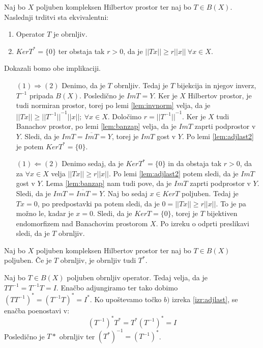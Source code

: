 \documentclass[mat2]{matdelo}
\newcommand{\abs}[1]{\ensuremath{\lvert #1 \rvert}}
\newcommand{\norm}[1]{\abs{\abs{#1}}}
\begin{document}
			\begin{posledica}
				\label{posl:adjinv}
				Naj bo $X$ poljuben kompleksen Hilbertov prostor ter naj bo $T\in B(X)$. Naslednji trditvi sta ekvivalentni: \begin{enumerate}
					\item Operator $T$ je obrnljiv.
					\item $KerT^* = \{0\}$ ter obstaja tak $r > 0$, da je $\norm{Tx} \geq r\norm{x}~\forall x\in X$.
				\end{enumerate}
			\end{posledica}
			
			\begin{dokaz}
				Dokazali bomo obe implikaciji.
				\begin{itemize}
					\item[$(1)\Rightarrow (2)$] Denimo, da je $T$ obrnljiv. Tedaj je $T$ bijekcija in njegov inverz, $T^{-1}$ pripada $B(X)$. Posledično je $ImT = Y$. Ker je $X$ Hilbertov prostor, je tudi normiran prostor, torej po lemi \ref{lem:invnorm} velja, da je $\norm{Tx}\geq \norm{T^{-1}}^{-1}\norm{x};~\forall x\in X$. Določimo $r = \norm{T^{-1}}^{-1}$. Ker je $X$ tudi Banachov prostor, po lemi \ref{lem:banzap} velja, da je $ImT$ zaprti podprostor v $Y$. Sledi, da je $ImT = \overline{ImT} = Y$, torej je $ImT$ gost v $Y$. Po lemi \ref{lem:adjlast2} je potem $KerT^* = \{0\}$.
					\item[$(1)\Leftarrow (2)$] Denimo sedaj, da je $KerT^* = \{0\}$ in da obstaja tak $r>0$, da za $\forall x\in X$ velja $\norm{Tx} \geq r\norm{x}$. Po lemi \ref{lem:adjlast2} potem sledi, da je $ImT$ gost v $Y$. Lema \ref{lem:banzap} nam tudi pove, da je $ImT$ zaprti podprostor v $Y$. Sledi, da je $ImT = \overline{ImT} = Y$.
					Naj bo sedaj $x\in KerT$ poljuben. Tedaj je $Tx = 0$, po predpostavki pa potem sledi, da je $0 = \norm{Tx} \geq r\norm{x}$. To je pa možno le, kadar je $x = 0$. Sledi, da je $KerT = \{0\}$, torej je $T$ bijektiven endomorfizem nad Banachovim prostorom $X$. Po izreku o odprti preslikavi sledi, da je $T$ obrnljiv.
				\end{itemize}
			\end{dokaz}
			
			\begin{lema}
				\label{lem:adjinv}
				Naj bo $X$ poljuben kompleksen Hilbertov prostor ter naj bo $T\in B(X)$ poljuben. Če je $T$ obrnljiv, je obrnljiv tudi $T^*$.
			\end{lema}
		
			\begin{dokaz}
				Naj bo $T\in B(X)$ poljuben obrnljiv operator. Tedaj velja, da je $TT^{-1} = T^{-1}T = I$. Enačbo adjungiramo ter tako dobimo $(TT^{-1})^* = (T^{-1}T)^* = I^*$. Ko upoštevamo točko $b)$ izreka \ref{izr:adjlast}, se enačba poenostavi v: $$(T^{-1})^*T^* = T^*(T^{-1})^* = I$$
				Posledično je $T*$ obrnljiv ter $(T^*)^{-1} = (T^{-1})^*$.
			\end{dokaz}
\end{document}
